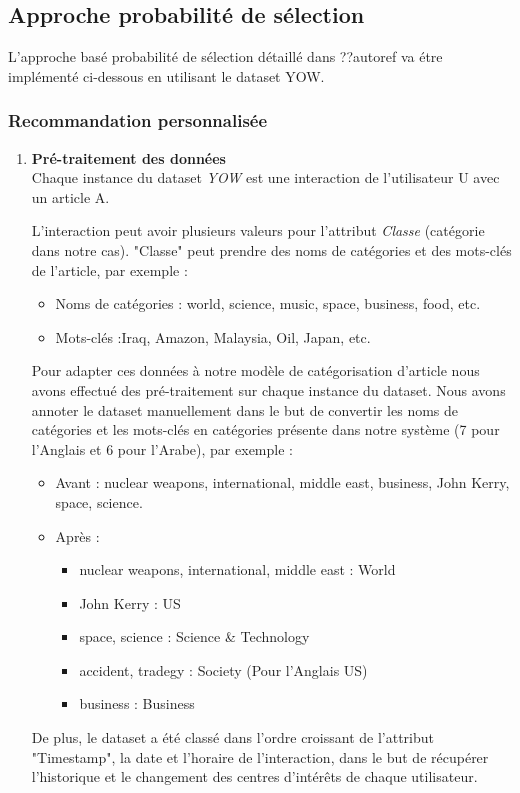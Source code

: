     \subsection{Approche probabilité de sélection}  
    L'approche basé probabilité de sélection détaillé dans ??autoref{} va étre implémenté ci-dessous en utilisant le dataset \textquotedbl YOW\textquotedbl.
        \subsubsection{Recommandation personnalisée}
        \begin{enumerate}[leftmargin=*]
            \item\textbf{Pré-traitement des données}\\
            Chaque instance du dataset \emph{YOW} est une interaction de l'utilisateur U avec un article A.

            L'interaction peut avoir plusieurs valeurs pour l'attribut \emph{Classe} (catégorie dans notre cas). "Classe" peut prendre des noms de catégories et des mots-clés de l'article, par exemple :
            \begin{itemize}
                \item Noms de catégories : world, science, music, space, business, food, etc.
                \item Mots-clés :Iraq, Amazon, Malaysia, Oil, Japan, etc.\\ 
            \end{itemize}
            Pour adapter ces données à notre modèle de catégorisation d'article nous avons effectué des pré-traitement sur chaque instance du dataset. Nous avons annoter le dataset manuellement dans le but de convertir les noms de catégories et les mots-clés en catégories présente dans notre système (7 pour l'Anglais et 6 pour l'Arabe), par exemple :
            \begin{itemize}
                \item Avant : nuclear weapons, international, middle east, business, John Kerry, space, science.
                \item Après :
                \begin{itemize}
                    \item {nuclear weapons, international, middle east} : World
                    \item {John Kerry} : US
                    \item {space, science} : Science \& Technology
                    \item {accident, tradegy} : Society (Pour l'Anglais US)
                    \item {business} : Business\\
                \end{itemize}    
            \end{itemize}
            De plus, le dataset a été classé dans l'ordre croissant de l'attribut "Timestamp", la date et l'horaire de l'interaction, dans le but de récupérer l'historique et le changement des centres d’intérêts de chaque utilisateur. 


\end{enumerate}
